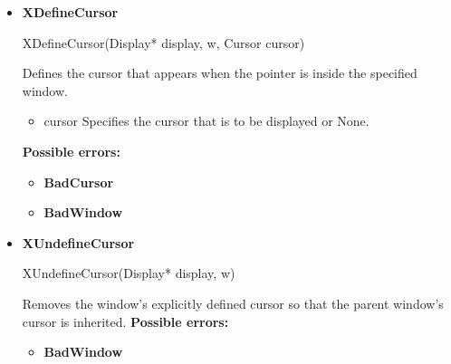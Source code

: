 \documentclass{report}
\begin{document}
\begin{itemize}
        \item \textbf{XDefineCursor}
            \bigbreak \noindent 
            \begin{cppcode}
                XDefineCursor(Display* display, w, Cursor cursor)
            \end{cppcode}
            \bigbreak \noindent
            Defines the cursor that appears when the pointer is inside the specified window.
            \begin{itemize}
                \item cursor Specifies the cursor that is to be displayed or None.
            \end{itemize}
            \bigbreak \noindent
            \textbf{Possible errors:}
            \begin{itemize}
                \item \textbf{BadCursor}
                \item \textbf{BadWindow}
            \end{itemize}
        \item \textbf{XUndefineCursor}
            \bigbreak \noindent 
            \begin{cppcode}
                XUndefineCursor(Display* display, w)
            \end{cppcode}
            \bigbreak \noindent
            Removes the window's explicitly defined cursor so that the parent window's cursor is inherited.
            \bigbreak \noindent
            \textbf{Possible errors:}
            \begin{itemize}
                \item \textbf{BadWindow}
            \end{itemize}

    \end{itemize}

    \pagebreak 
\end{document}
